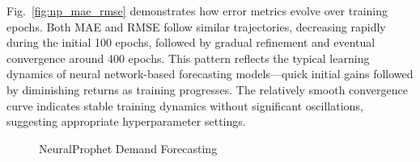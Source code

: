 \par Fig.~\ref{fig:np_mae_rmse} demonstrates how error metrics evolve over training epochs. Both MAE and RMSE follow similar trajectories, decreasing rapidly during the initial 100 epochs, followed by gradual refinement and eventual convergence around 400 epochs. This pattern reflects the typical learning dynamics of neural network-based forecasting models—quick initial gains followed by diminishing returns as training progresses. The relatively smooth convergence curve indicates stable training dynamics without significant oscillations, suggesting appropriate hyperparameter settings.


\begin{figure}[htbp]
    \centering
    \caption{NeuralProphet Demand Forecasting}
    \label{fig:forecast}
\end{figure}
